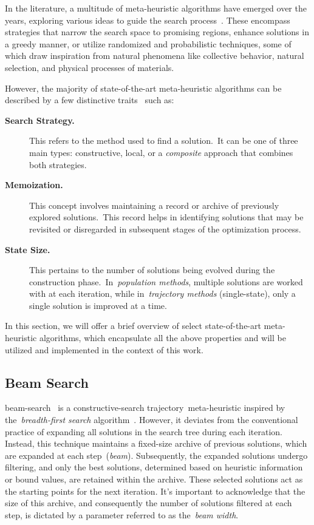 In the literature, a multitude of meta-heuristic algorithms have emerged over
the years, exploring various ideas to guide the search
process~\cite{osman1996metaheuristics}. These encompass strategies that narrow
the search space to promising regions, enhance solutions in a greedy manner, or
utilize randomized and probabilistic techniques, some of which draw inspiration
from natural phenomena like collective behavior, natural selection, and physical
processes of materials.

However, the majority of state-of-the-art meta-heuristic algorithms can be
described by a few distinctive traits~\cite{blum2003metaheuristics} such as:

\begin{description}
  \item[\textbf{Search Strategy.}] This refers to the method used to find a
    solution.~It can be one of three main types: constructive, local, or a
    \emph{composite} approach that combines both strategies.

  \item[\textbf{Memoization.}] This concept involves maintaining a record or
    archive of previously explored solutions.~This record helps in identifying
    solutions that may be revisited or disregarded in subsequent stages of the
    optimization process.

  \item[\textbf{State Size.}] This pertains to the number of solutions being
    evolved during the construction phase.~In~\emph{population methods}, multiple
    solutions are worked with at each iteration, while in~\emph{trajectory methods} (single-state),
    only a single solution is improved at a time.
\end{description}

In this section, we will offer a brief overview of select state-of-the-art
\acrshort{meta-heuristic} algorithms, which encapsulate all the above properties
and will be utilized and implemented in the context of this work.

\subsection{Beam Search}
\label{subsec:beam-search}

\acrfull{beam-search}~\cite{ow1988filtered,outeiro2021application} is a
\acrshort{constructive-search} trajectory~\acrfull{meta-heuristic} inspired by
the~\emph{breadth-first search} algorithm~\cite{papadimitriou1998combinatorial}.
However, it deviates from the conventional practice of expanding all solutions
in the search tree during each iteration. Instead, this technique maintains a
fixed-size archive of previous solutions, which are expanded at each
step~(\textit{beam}). Subsequently, the expanded solutions undergo filtering,
and only the best solutions, determined based on heuristic information or bound
values, are retained within the archive. These selected solutions act as the
starting points for the next iteration. It's important to acknowledge that the
size of this archive, and consequently the number of solutions filtered at each
step, is dictated by a parameter referred to as the~\emph{beam width}.

